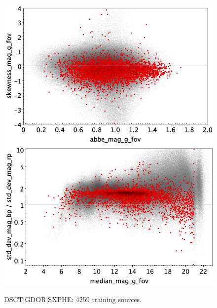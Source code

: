 \documentclass[longauth]{aa}
\begin{document}
\begin{appendix}
\begin{figure}
\vspace{4mm}
 \includegraphics[width=0.45\hsize]{figures/appendix/DSCT_trn_ask.png}  %
\hspace{2mm}
 \includegraphics[width=0.45\hsize]{figures/appendix/DSCT_trn_msdr.png}  \\ %
\vspace{4mm}
 \caption{DSCT|GDOR|SXPHE: 4259 training sources.}  
 \label{fig:app:DSCT_trn}
\end{figure}


\end{appendix}
\end{document}
